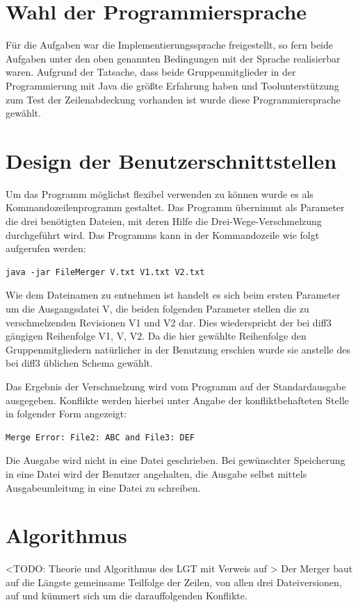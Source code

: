 \documentclass[a4paper,titlepage,12pt]{scrartcl}
\begin{document}
\section{Wahl der Programmiersprache}
\label{sec:proglang}
Für die Aufgaben war die Implementierungssprache freigestellt, so fern beide Aufgaben unter den oben genannten Bedingungen mit der Sprache realisierbar waren. Aufgrund der Tatsache, dass beide Gruppenmitglieder in der Programmierung mit Java die größte Erfahrung haben und Toolunterstützung zum Test der Zeilenabdeckung vorhanden ist wurde diese Programmiersprache gewählt.

\section{Design der Benutzerschnittstellen}
\label{sec:design}
Um das Programm möglichst flexibel verwenden zu können wurde es als Kommandozeilenprogramm gestaltet.
Das Programm übernimmt als Parameter die drei benötigten Dateien, mit deren Hilfe die Drei-Wege-Verschmelzung durchgeführt wird. Das Programms kann in der Kommandozeile wie folgt aufgerufen werden:

\lstset{language=sh, numbers=none, xleftmargin=0pt}
\begin{lstlisting}
java -jar FileMerger V.txt V1.txt V2.txt
\end{lstlisting}
Wie dem Dateinamen zu entnehmen ist handelt es sich beim ersten Parameter um die Ausgangsdatei V, die beiden folgenden Parameter stellen die zu verschmelzenden Revisionen V1 und V2 dar. Dies wiederspricht der bei diff3 gängigen Reihenfolge V1, V, V2. Da die hier gewählte Reihenfolge den Gruppenmitgliedern natürlicher in der Benutzung erschien wurde sie anstelle des bei diff3 üblichen Schema gewählt.

Das Ergebnis der Verschmelzung wird vom Programm auf der Standardausgabe ausgegeben. Konflikte werden hierbei unter Angabe der konfliktbehafteten Stelle in folgender Form angezeigt:

\begin{verbatim}
Merge Error: File2: ABC and File3: DEF
\end{verbatim}


Die Ausgabe wird nicht in eine Datei geschrieben. Bei gewünschter Speicherung in eine Datei wird der Benutzer angehalten, die Ausgabe selbst mittels Ausgabeumleitung in eine Datei zu schreiben.

\section{Algorithmus}
\label{sec:algorithm}
<TODO: Theorie und Algorithmus des LGT mit Verweis auf \citet{www:EP96}>
Der Merger baut auf die Längste gemeinsame Teilfolge der Zeilen, von allen drei Dateiversionen, auf und kümmert sich um die darauffolgenden Konflikte.
\end{document}
